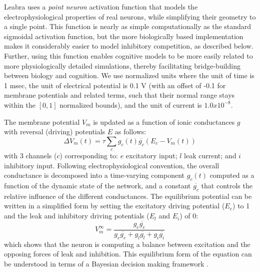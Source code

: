 \documentclass[11pt,twoside]{article}
\newif\myifpdf
\begin{document}
Leabra uses a {\em point neuron} activation function that models the electrophysiological properties of real neurons, while simplifying their geometry to a single point. This function is nearly as simple computationally as the standard sigmoidal activation function, but the more biologically based implementation makes it considerably easier to model inhibitory competition, as described below. Further, using this function enables cognitive models to be more easily related to more physiologically detailed simulations, thereby facilitating bridge-building between biology and cognition. We use normalized units where the unit of time is 1 msec, the unit of electrical potential is 0.1 V (with an offset of -0.1 for membrane potentials and related terms, such that their normal range stays within the $[0, 1]$ normalized bounds), and the unit of current is $1.0x10^{-8}$.

The membrane potential $V_m$ is updated as a function of ionic conductances $g$ with reversal (driving) potentials $E$ as follows:
\begin{equation}
 \Delta V_m(t) = \tau \sum_c g_c(t) \overline{g_c} (E_c - V_m(t))
 \label{eq.vm}
\end{equation}
with 3 channels ($c$) corresponding to: $e$ excitatory input; $l$ leak current; and $i$ inhibitory input. Following electrophysiological convention, the overall conductance is decomposed into a time-varying component $g_c(t)$ computed as a function of the dynamic state of the network, and a constant $\overline{g_c}$ that controls the relative influence of the different conductances. The equilibrium potential can be written in a simplified form by setting the excitatory driving potential ($E_e$) to 1 and the leak and inhibitory driving potentials ($E_l$ and $E_i$) of 0:
\begin{equation}
 V_m^\infty = \frac{g_e \overline{g_e}} {g_e
  \overline{g_e} + g_l \overline{g_l} + g_i \overline{g_i}} 
\end{equation}
which shows that the neuron is computing a balance between excitation and the opposing forces of leak and inhibition. This equilibrium form of the equation can be understood in terms of a Bayesian decision making framework \cite{OReillyMunakata00}.
\end{document}
